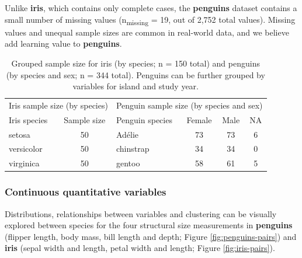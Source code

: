 Unlike \textbf{iris}, which contains only complete cases, the
\textbf{penguins} dataset contains a small number of missing values
(n\textsubscript{missing} = 19, out of 2,752 total values). Missing
values and unequal sample sizes are common in real-world data, and we
believe add learning value to \textbf{penguins}.

\begin{Schunk}
\begin{table}

\caption{\label{tab:unnamed-chunk-1}Grouped sample size for iris (by species; n = 150 total) and penguins (by species and sex; n = 344 total). Penguins can be further grouped by variables for island and study year.}
\centering
\begin{tabular}[t]{l|c|l|c|c|c}
\hline
\multicolumn{2}{c|}{Iris sample size (by species)} & \multicolumn{4}{c}{Penguin sample size (by species and sex)} \\
\cline{1-2} \cline{3-6}
Iris species & Sample size & Penguin species & Female & Male & NA\\
\hline
setosa & 50 & Adélie & 73 & 73 & 6\\
\hline
versicolor & 50 & chinstrap & 34 & 34 & 0\\
\hline
virginica & 50 & gentoo & 58 & 61 & 5\\
\hline
\end{tabular}
\end{table}

\end{Schunk}

\hypertarget{continuous-quantitative-variables}{%
\subsubsection{Continuous quantitative
variables}\label{continuous-quantitative-variables}}

Distributions, relationships between variables and clustering can be
visually explored between species for the four structural size
measurements in \textbf{penguins} (flipper length, body mass, bill
length and depth; Figure \ref{fig:penguins-pairs}) and \textbf{iris}
(sepal width and length, petal width and length; Figure
\ref{fig:iris-pairs}).

